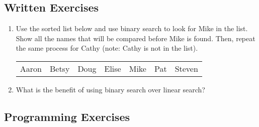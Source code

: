 
\subsection{Written Exercises}

\setcounter{counter}{1}
\begin{enumerate}[label={\arabic{counter}\addtocounter{counter}{1}}.]

\item Use the sorted list below and use binary search to look for Mike in the list. Show all the names that will be compared before Mike is found. Then, repeat the same process for Cathy (note: Cathy is not in the list).
\begin{table}[h]
\begin{tabular}{lllllll}
Aaron & Betsy & Doug & Elise & Mike & Pat & Steven
\end{tabular}
\end{table}

\item What is the benefit of using binary search over linear search?


\end{enumerate}

\subsection{Programming Exercises}